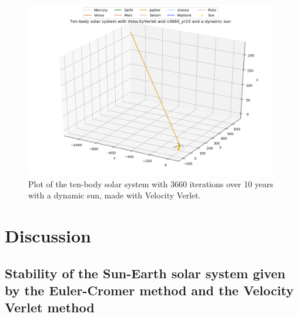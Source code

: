 \documentclass{article}
\begin{document}
    \begin{figure}[H]
        \centering
        \includegraphics[width = 11cm]{img/plot3D_10body_V_n3660_yr10_dynamic_sun.png}
        \caption{Plot of the ten-body solar system with 3660 iterations over 10 years with a dynamic sun, made with Velocity Verlet.}
        \label{fig:plot3D_10body_V_n3660_yr10_dynamic_sun}
    \end{figure}


\vspace{1cm}

\clearpage
\newpage

\section{Discussion} \label{sec:Discussion}


\subsection{Stability of the Sun-Earth solar system given by the Euler-Cromer method and the Velocity Verlet method}    \label{sec:stabilitySE}
\end{document}
